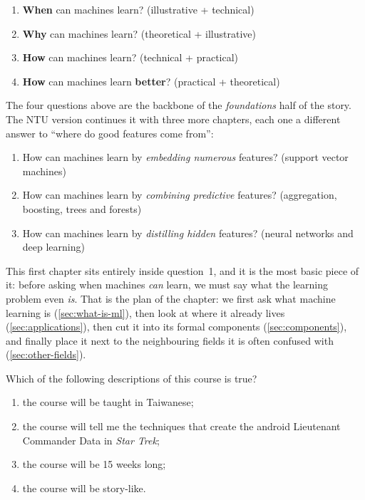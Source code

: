\begin{enumerate}
    \item \textbf{When} can machines learn? (illustrative + technical)
    \item \textbf{Why} can machines learn? (theoretical + illustrative)
    \item \textbf{How} can machines learn? (technical + practical)
    \item \textbf{How} can machines learn \textbf{better}? (practical + theoretical)
\end{enumerate}

\begin{note}
    The four questions above are the backbone of the \emph{foundations} half of
    the story. The NTU version continues it with three more chapters, each one a
    different answer to ``where do good features come from'':
    \begin{enumerate}[start=5]
        \item How can machines learn by \emph{embedding numerous} features?
            (support vector machines)
        \item How can machines learn by \emph{combining predictive} features?
            (aggregation, boosting, trees and forests)
        \item How can machines learn by \emph{distilling hidden} features?
            (neural networks and deep learning)
    \end{enumerate}
\end{note}

This first chapter sits entirely inside question~1, and it is the most basic
piece of it: before asking when machines \emph{can} learn, we must say what the
learning problem even \emph{is}. That is the plan of the chapter: we first ask
what machine learning is (\autoref{sec:what-is-ml}), then look at where it
already lives (\autoref{sec:applications}), then cut it into its formal
components (\autoref{sec:components}), and finally place it next to the
neighbouring fields it is often confused with (\autoref{sec:other-fields}).

\begin{exercise}
    Which of the following descriptions of this course is true?
    \begin{enumerate}[(1)]
        \item the course will be taught in Taiwanese;
        \item the course will tell me the techniques that create the android
            Lieutenant Commander Data in \emph{Star Trek};
        \item the course will be 15 weeks long;
        \item the course will be story-like.
    \end{enumerate}
\end{exercise}

